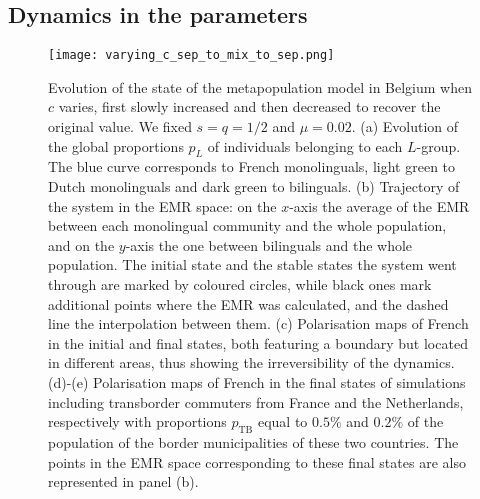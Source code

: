 \documentclass[../thesis.tex]{subfiles}
\begin{document}
\subsection{Dynamics in the parameters}
\begin{figure}
  \centering
  \texttt{[image: varying\_c\_sep\_to\_mix\_to\_sep.png]}
  \caption{Evolution of the state of the metapopulation model in Belgium when $c$
  varies, first slowly increased and then decreased to recover the original value. We
  fixed $s=q=1/2$ and $\mu=0.02$. (a) Evolution of the global proportions $p_L$ of
  individuals belonging to each $L$-group. The blue curve corresponds to French
  monolinguals, light green to Dutch monolinguals and dark green to bilinguals. (b)
  Trajectory of the system in the \ac{EMR} space: on the $x$-axis the average of the
  \ac{EMR} between each monolingual community and the whole population, and on the
  $y$-axis the one between bilinguals and the whole population. The initial state and
  the stable states the system went through are marked by coloured circles, while
  black ones mark additional points where the \ac{EMR} was calculated, and the dashed
  line the interpolation between them. (c) Polarisation maps of French in the initial
  and final states, both featuring a boundary but located in different areas, thus
  showing the irreversibility of the dynamics. (d)-(e) Polarisation maps of French in
  the final states of simulations including transborder commuters from France and the
  Netherlands, respectively with proportions $p_{\text{TB}}$ equal to $0.5\%$ and
  $0.2\%$ of the population of the border municipalities of these two countries. The
  points in the \ac{EMR} space corresponding to these final states are also
  represented in panel (b).}
  \label{fig:varying_c_sep_to_mix_to_sep}
\end{figure}
    
\end{document}
